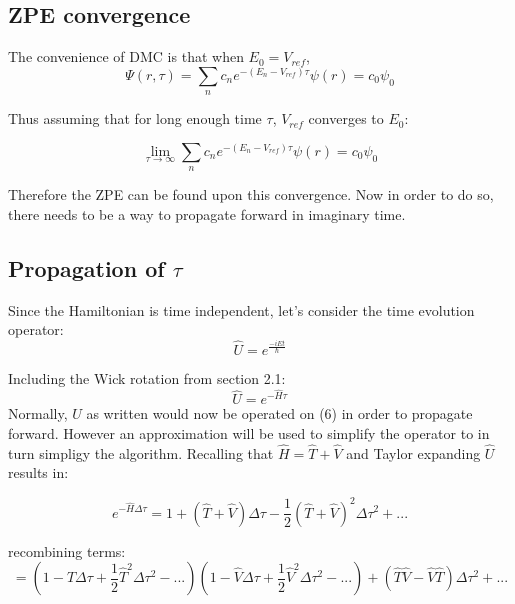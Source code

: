 \documentclass{article}
\begin{document}
\subsection{ZPE convergence}
The convenience of DMC is that when $E_{0}=V_{ref}$, 
\begin{equation} \label{eqn}
\Psi(r,\tau)=\sum_{n}c_{n}e^{-(E_{n}-V_{ref})\tau}\psi(r) = c_{0}\psi_{0}
\end{equation}

Thus assuming that for long enough time $\tau$, $V_{ref}$ converges to $E_{0}$:

\begin{equation} \label{eqn}
\lim_{\tau\to\infty}\sum_{n}c_{n}e^{-(E_{n}-V_{ref})\tau}\psi(r) = c_{0}\psi_{0}
\end{equation}

Therefore the ZPE can be found upon this convergence.
Now in order to do so, there needs to be a way to propagate forward in imaginary time. 

\subsection{Propagation of $\tau$}
Since the Hamiltonian is time independent, let's consider the time evolution operator:
\begin{equation} \label{eqn}
\hat{U}=e^{\frac{-iEt}{\hbar}}
\end{equation}

Including the Wick rotation from section 2.1:
\begin{equation} \label{eqn}
\hat{U}=e^{-\hat{H}\tau}
\end{equation}
Normally, $\hat{U}$ as written would now be operated on (6) in order to propagate forward. 
However an approximation will be used to simplify the operator to in turn simpligy the algorithm. 
Recalling that $\hat{H}=\hat{T}+\hat{V}$ and Taylor expanding $\hat{U}$ results in:

\begin{equation} \label{eqn}
e^{-\hat{H}\Delta\tau}=1+(\hat{T}+\hat{V})\Delta\tau-\frac{1}{2}(\hat{T}+\hat{V})^2\Delta\tau^2+...
\end{equation}

recombining terms:
\begin{equation} \label{eqn}
=(1-\hat{T}\Delta\tau+\frac{1}{2}\hat{T}^2\Delta\tau^2-...)(1-\hat{V}\Delta\tau+\frac{1}{2}\hat{V}^2\Delta\tau^2-...)+(\hat{T}\hat{V}-\hat{V}\hat{T})\Delta\tau^2+...
\end{equation}
\end{document}
